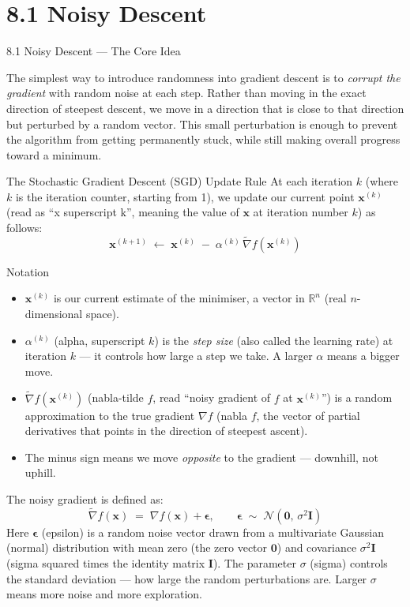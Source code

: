 \documentclass[aspectratio=169,10pt]{beamer}
\begin{document}
\section{8.1 Noisy Descent}

\begin{frame}[allowframebreaks]{8.1 Noisy Descent --- The Core Idea}

The simplest way to introduce randomness into gradient descent is to \emph{corrupt the gradient} with random noise at each step.
Rather than moving in the exact direction of steepest descent, we move in a direction that is close to that direction but perturbed by a random vector.
This small perturbation is enough to prevent the algorithm from getting permanently stuck, while still making overall progress toward a minimum.

\begin{block}{The Stochastic Gradient Descent (SGD) Update Rule}
At each iteration $k$ (where $k$ is the iteration counter, starting from 1), we update our current point $\mathbf{x}^{(k)}$ (read as ``x superscript k'', meaning the value of $\mathbf{x}$ at iteration number $k$) as follows:
\[
  \mathbf{x}^{(k+1)} \;\leftarrow\; \mathbf{x}^{(k)} \;-\; \alpha^{(k)}\,\tilde{\nabla} f\!\left(\mathbf{x}^{(k)}\right)
\]
\end{block}

\begin{block}{Notation}
\begin{itemize}
  \item $\mathbf{x}^{(k)}$ is our current estimate of the minimiser, a vector in $\mathbb{R}^n$ (real $n$-dimensional space).
  \item $\alpha^{(k)}$ (alpha, superscript $k$) is the \emph{step size} (also called the learning rate) at iteration $k$ --- it controls how large a step we take. A larger $\alpha$ means a bigger move.
  \item $\tilde{\nabla} f(\mathbf{x}^{(k)})$ (nabla-tilde $f$, read ``noisy gradient of $f$ at $\mathbf{x}^{(k)}$'') is a random approximation to the true gradient $\nabla f$ (nabla $f$, the vector of partial derivatives that points in the direction of steepest ascent).
  \item The minus sign means we move \emph{opposite} to the gradient --- downhill, not uphill.
\end{itemize}
The noisy gradient is defined as:
\[
  \tilde{\nabla} f(\mathbf{x}) \;=\; \nabla f(\mathbf{x}) + \boldsymbol{\epsilon}, \qquad
  \boldsymbol{\epsilon} \;\sim\; \mathcal{N}(\mathbf{0},\, \sigma^2 \mathbf{I})
\]
Here $\boldsymbol{\epsilon}$ (epsilon) is a random noise vector drawn from a multivariate Gaussian (normal) distribution with mean zero (the zero vector $\mathbf{0}$) and covariance $\sigma^2 \mathbf{I}$ (sigma squared times the identity matrix $\mathbf{I}$). The parameter $\sigma$ (sigma) controls the standard deviation --- how large the random perturbations are. Larger $\sigma$ means more noise and more exploration.
\end{block}


\end{frame}
\end{document}
